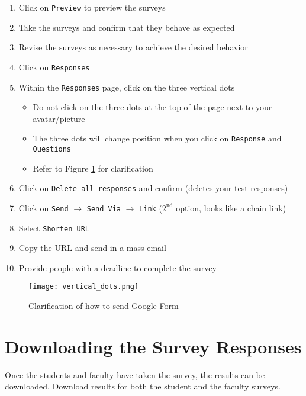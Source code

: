 \begin{enumerate}
	\item Click on \texttt{Preview} to preview the surveys
	\item Take the surveys and confirm that they behave as expected
	\item Revise the surveys as necessary to achieve the desired behavior
	\item Click on \texttt{Responses}
	\item Within the \texttt{Responses} page, click on the three vertical dots
		\begin{itemize}
			\item Do not click on the three dots at the top of the page next to your avatar/picture
			\item The three dots will change position when you click on \texttt{Response} and \texttt{Questions}
			\item Refer to Figure \ref{fig:vertical_dots} for clarification
		\end{itemize}
	\item Click on \texttt{Delete all responses} and confirm (deletes your test responses)
	\item Click on \texttt{Send} $\rightarrow$ \texttt{Send Via} $\rightarrow$ \texttt{Link} ($2^\text{nd}$ option, looks like a chain link)
	\item Select \texttt{Shorten URL}
	\item Copy the URL and send in a mass email
	\item Provide people with a deadline to complete the survey
\end{enumerate}

\begin{figure}
	\centering
	\texttt{[image: vertical\_dots.png]}
	\caption{\label{fig:vertical_dots} Clarification of how to send Google Form}
\end{figure}



%
%
\section{Downloading the Survey Responses}

Once the students and faculty have taken the survey, the results can be downloaded.  Download results for both the student and the faculty surveys.

